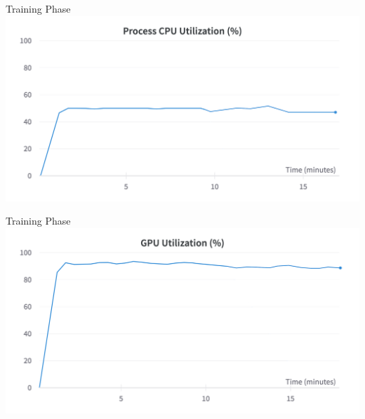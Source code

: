 \begin{frame}{Training Phase}
	\centering
	\includegraphics[width=\textwidth]{sections/4_models/imgs/trans/gabrielcputilization.png}
\end{frame}
\begin{frame}{Training Phase}
	\centering
	\includegraphics[width=\textwidth]{sections/4_models/imgs/trans/gabrielgpuutilizationperc.png}
\end{frame}